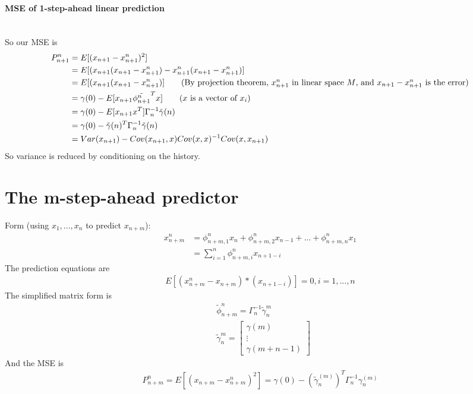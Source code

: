 \paragraph{MSE of 1-step-ahead linear prediction} \mbox{}\\
So our MSE is 
    \begin{align*}
    P_{n+1}^n 
    & = E[(x_{n+1} - x_{n+1}^n)^2]\\
    & = E[(x_{n+1}(x_{n+1} - x_{n+1}^n) -  x_{n+1}^n(x_{n+1} - x_{n+1}^n)]\\
    & =  E[(x_{n+1}(x_{n+1} - x_{n+1}^n)] \tag{By projection theorem, $x^n_{n+1}$ in linear space $M$, and $x_{n+1} - x_{n+1}^n$ is the error} \\
    & = \gamma(0) - E[x_{n+1} \tilde{\phi_{n+1}^n}^T x] \tag{$x$ is a vector of $x_i$}\\
    & = \gamma(0) - E[x_{n+1} x^T] \Gamma_n^{-1} \tilde{\gamma}(n)\\
    & = \gamma(0) - \tilde{\gamma}(n)^T \Gamma_n^{-1} \tilde{\gamma}(n)\\
    & = Var(x_{n+1}) - Cov(x_{n+1}, x) Cov(x,x)^{-1} Cov(x, x_{n+1})\\
    \end{align*}
So variance is reduced by conditioning on the history. 


\section{The m-step-ahead predictor}
Form (using $x_1, ..., x_n$ to predict $x_{n+m}$): 
    \begin{align*}
        x_{n+m}^n 
        & = \phi_{n+m, 1}^n x_n + \phi_{n+m, 2}^n x_{n-1} + ... +  \phi_{n+m, n}^n x_{1}\\
        & = \sum_{i=1}^n \phi_{n+m, i}^n x_{n+1-i}
    \end{align*}
The prediction equations are 
    \begin{align*}
        E\left[ (x_{n+m}^n - x_{n+m}) * (x_{n+1-i}) \right] = 0, i = 1,...,n 
    \end{align*}
The simplified matrix form is 
    \begin{align*}
        & \tilde{\phi}_{n+m}^n = \Gamma_n^{-1} \tilde{\gamma}_n^m\\
        & \tilde{\gamma}_n^m = 
            \begin{bmatrix}
                \gamma(m) \\ \vdots \\ \gamma(m+n-1)
            \end{bmatrix}
    \end{align*}
And the MSE is 
    \begin{align*}
        P_{n+m}^n = E\left[ (x_{n+m} - x_{n+m}^n)^2 \right] = \gamma(0) - (\tilde{\gamma}_n^{(m)})^T \Gamma_n^{-1} \gamma_n^{(m)}
    \end{align*}

